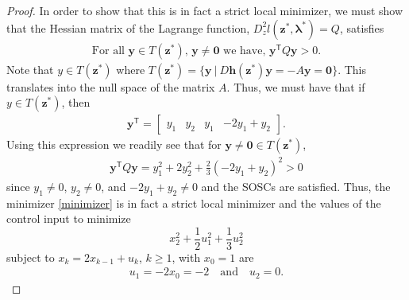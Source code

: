 \documentclass[12pt]{article}
\theoremstyle{definition}
\newcommand{\vc}[1]{\boldsymbol{#1}}
\newcommand{\tran}{\mathsf{T}}
\begin{document}
\begin{proof}
  In order to show that this is in fact a strict local minimizer, we must show that
  the Hessian matrix of the Lagrange function,
  $D^2_z l(\vc{z}^{*},\vc{\lambda}^{*}) = Q$, satisfies
  \begin{align*}
    \text{For all $\vc{y} \in T(\vc{z}^{*})$, $\vc{y}\neq\vc{0}$ we have, }  \vc{y}^\tran Q \vc{y} > 0.
  \end{align*}
  Note that $y\in T(\vc{z}^{*})$ where $T(\vc{z}^{*}) = \{\vc{y}\ |\ D\vc{h}(\vc{z}^{*})\vc{y}=-A\vc{y}=\vc{0}\}$.
  This translates into the null space of the matrix $A$. Thus, we must have that if $y\in T(\vc{z}^{*})$, then
  \begin{align*}
    \vc{y}^\tran =  \begin{bmatrix}y_1 & y_2 & y_1 & -2y_1+y_2\end{bmatrix}.
  \end{align*}
  Using this expression we readily see that for $\vc{y} \neq \vc{0}\in T(\vc{z}^{*})$,
  \begin{align*}
    \vc{y}^\tran Q \vc{y} = y_1^2 + 2 y_2^2 + \frac{2}{3} (-2 y_1 + y_2)^2 > 0
  \end{align*}
  since $y_1 \neq 0$, $y_2 \neq 0$, and $-2 y_1 + y_2\neq 0$ and the SOSCs are satisfied.
  Thus, the minimizer \eqref{minimizer} is in fact a strict local minimizer and
  the values of the control input to minimize
  $$x_2^2 + \frac{1}{2}u_1^2+ \frac{1}{3}u_2^2$$ subject to   $x_k = 2 x_{k-1} + u_k$, $k \geq 1$, with
  $x_0 = 1$ are
  \begin{align*}
    u_1 = -2x_0 = -2 \quad \text{and} \quad u_2 = 0.
  \end{align*}
\end{proof}
\end{document}
